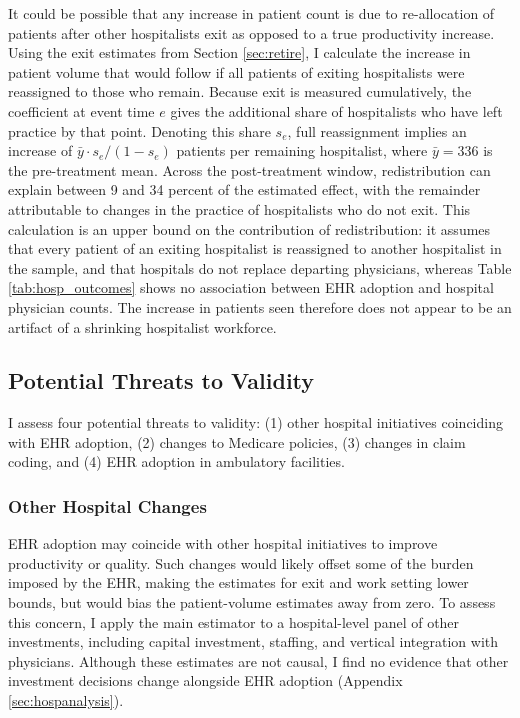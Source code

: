 \documentclass[12pt]{article}
\begin{document}
It could be possible that any increase in patient count is due to re-allocation of patients after other hospitalists exit as opposed to a true productivity increase. Using the exit estimates from Section \ref{sec:retire}, I calculate the increase in patient volume that would follow if all patients of exiting hospitalists were reassigned to those who remain. Because exit is measured cumulatively, the coefficient at event time $e$ gives the additional share of hospitalists who have left practice by that point. Denoting this share $s_e$, full reassignment implies an increase of $\bar{y} \cdot s_e/(1-s_e)$ patients per remaining hospitalist, where $\bar{y} = 336$ is the pre-treatment mean. Across the post-treatment window, redistribution can explain between 9 and 34 percent of the estimated effect, with the remainder attributable to changes in the practice of hospitalists who do not exit. This calculation is an upper bound on the contribution of redistribution: it assumes that every patient of an exiting hospitalist is reassigned to another hospitalist in the sample, and that hospitals do not replace departing physicians, whereas Table \ref{tab:hosp_outcomes} shows no association between EHR adoption and hospital physician counts. The increase in patients seen therefore does not appear to be an artifact of a shrinking hospitalist workforce.


\subsection{Potential Threats to Validity}\label{sec:alt_main}

I assess four potential threats to validity: (1) other hospital initiatives coinciding with EHR adoption, (2) changes to Medicare policies, (3) changes in claim coding, and (4) EHR adoption in ambulatory facilities.


\subsubsection{Other Hospital Changes}

EHR adoption may coincide with other hospital initiatives to improve productivity or quality. Such changes would likely offset some of the burden imposed by the EHR, making the estimates for exit and work setting lower bounds, but would bias the patient-volume estimates away from zero. To assess this concern, I apply the main estimator to a hospital-level panel of other investments, including capital investment, staffing, and vertical integration with physicians. Although these estimates are not causal, I find no evidence that other investment decisions change alongside EHR adoption (Appendix \ref{sec:hospanalysis}).
\end{document}
